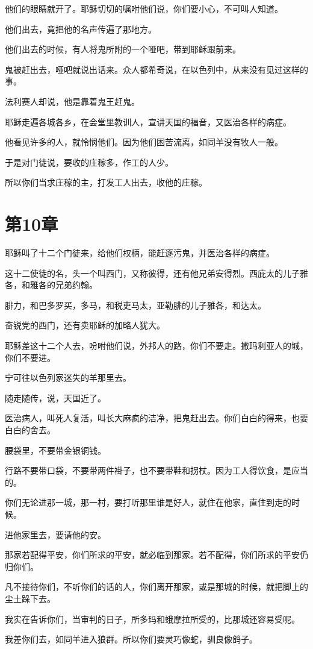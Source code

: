\documentclass[12pt,oneside]{book}
\begin{document}
他们的眼睛就开了。耶稣切切的嘱咐他们说，你们要小心，不可叫人知道。

他们出去，竟把他的名声传遍了那地方。

他们出去的时候，有人将鬼所附的一个哑吧，带到耶稣跟前来。

鬼被赶出去，哑吧就说出话来。众人都希奇说，在以色列中，从来没有见过这样的事。

法利赛人却说，他是靠着鬼王赶鬼。

耶稣走遍各城各乡，在会堂里教训人，宣讲天国的福音，又医治各样的病症。

他看见许多的人，就怜悯他们。因为他们困苦流离，如同羊没有牧人一般。

于是对门徒说，要收的庄稼多，作工的人少。

所以你们当求庄稼的主，打发工人出去，收他的庄稼。

\chapter{第10章}
耶稣叫了十二个门徒来，给他们权柄，能赶逐污鬼，并医治各样的病症。

这十二使徒的名，头一个叫西门，又称彼得，还有他兄弟安得烈。西庇太的儿子雅各，和雅各的兄弟约翰。

腓力，和巴多罗买，多马，和税吏马太，亚勒腓的儿子雅各，和达太。

奋锐党的西门，还有卖耶稣的加略人犹大。

耶稣差这十二个人去，吩咐他们说，外邦人的路，你们不要走。撒玛利亚人的城，你们不要进。

宁可往以色列家迷失的羊那里去。

随走随传，说，天国近了。

医治病人，叫死人复活，叫长大麻疯的洁净，把鬼赶出去。你们白白的得来，也要白白的舍去。

腰袋里，不要带金银铜钱。

行路不要带口袋，不要带两件褂子，也不要带鞋和拐杖。因为工人得饮食，是应当的。

你们无论进那一城，那一村，要打听那里谁是好人，就住在他家，直住到走的时候。

进他家里去，要请他的安。

那家若配得平安，你们所求的平安，就必临到那家。若不配得，你们所求的平安仍归你们。

凡不接待你们，不听你们的话的人，你们离开那家，或是那城的时候，就把脚上的尘土跺下去。

我实在告诉你们，当审判的日子，所多玛和蛾摩拉所受的，比那城还容易受呢。

我差你们去，如同羊进入狼群。所以你们要灵巧像蛇，驯良像鸽子。
\end{document}
